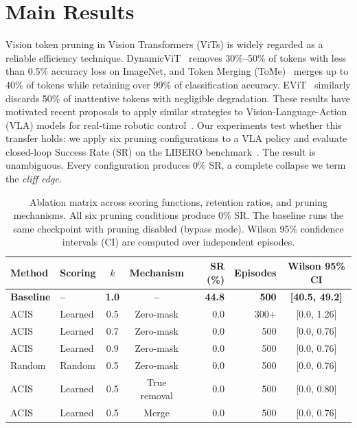 \section{Main Results}
\label{sec:results}

Vision token pruning in Vision Transformers (ViTs) is widely regarded as a reliable efficiency technique.
DynamicViT~\cite{rao2021dynamicvit} removes 30\%--50\% of tokens with less than 0.5\% accuracy loss on ImageNet, and Token Merging (ToMe)~\cite{bolya2023tome} merges up to 40\% of tokens while retaining over 99\% of classification accuracy.
EViT~\cite{liang2022evit} similarly discards 50\% of inattentive tokens with negligible degradation.
These results have motivated recent proposals to apply similar strategies to Vision-Language-Action (VLA) models for real-time robotic control~\cite{xu2025vlacache,cheng2026vlaiap}.
Our experiments test whether this transfer holds: we apply six pruning configurations to a VLA policy and evaluate closed-loop Success Rate (SR) on the LIBERO benchmark~\cite{liu2023libero}.
The result is unambiguous.
Every configuration produces 0\% SR, a complete collapse we term the \emph{cliff edge}.

\begin{table}[t]
\centering
\caption{Ablation matrix across scoring functions, retention ratios, and pruning mechanisms. All six pruning conditions produce 0\% SR. The baseline runs the same checkpoint with pruning disabled (bypass mode). Wilson 95\% confidence intervals (CI) are computed over independent episodes.}
\label{tab:ablation_matrix}
\small
\begin{tabular}{@{}llccrrc@{}}
\toprule
Method & Scoring & $k$ & Mechanism & SR (\%) & Episodes & Wilson 95\% CI \\
\midrule
\textbf{Baseline} & \textbf{--} & \textbf{1.0} & \textbf{--} & \textbf{44.8} & \textbf{500} & \textbf{[40.5, 49.2]} \\
\midrule
ACIS & Learned & 0.5 & Zero-mask & 0.0 & 300+ & [0.0, 1.26] \\
ACIS & Learned & 0.7 & Zero-mask & 0.0 & 500 & [0.0, 0.76] \\
ACIS & Learned & 0.9 & Zero-mask & 0.0 & 500 & [0.0, 0.76] \\
Random & Random & 0.5 & Zero-mask & 0.0 & 500 & [0.0, 0.76] \\
ACIS & Learned & 0.5 & True removal & 0.0 & 500 & [0.0, 0.80] \\
ACIS & Learned & 0.5 & Merge & 0.0 & 500 & [0.0, 0.76] \\
\bottomrule
\end{tabular}
\end{table}


